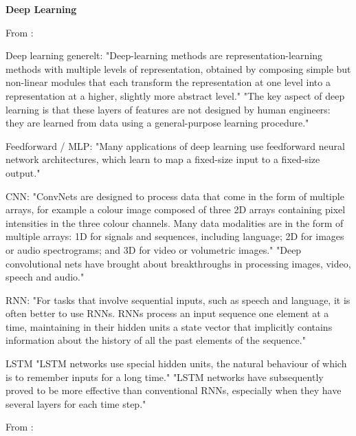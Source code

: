 \textbf{Deep Learning}

From \parencite{lecun2015deep_learning}:

Deep learning generelt:
"Deep-learning methods are representation-learning methods with multiple levels of representation, obtained by composing simple but non-linear modules that each transform the representation at one level into a representation at a higher, slightly more abstract level."
"The key aspect of deep learning is that these layers of features are not designed by human engineers: they are learned from data using a general-purpose learning procedure."

Feedforward / MLP:
"Many applications of deep learning use feedforward neural network architectures, which learn to map a fixed-size input to a fixed-size output."

CNN:
"ConvNets are designed to process data that come in the form of multiple arrays, for example a colour image composed of three 2D arrays containing pixel intensities in the three colour channels. Many data modalities are in the form of multiple arrays: 1D for signals and sequences, including language; 2D for images or audio spectrograms; and 3D for video or volumetric images."
"Deep convolutional nets have brought about breakthroughs in processing images, video, speech and audio."

RNN:
"For tasks that involve sequential inputs, such as speech and language, it is often better to use RNNs. RNNs process an input sequence one element at a time, maintaining in their hidden units a state vector that implicitly contains information about the history of all the past elements of the sequence."

LSTM
"LSTM networks use special hidden units, the natural behaviour of which is to remember inputs for a long time."
"LSTM networks have subsequently proved to be more effective than conventional RNNs, especially when they have several layers for each time step."

From \parencite{sarker2021machine_learning_algorithms_real_world_applications_research_directions}:

